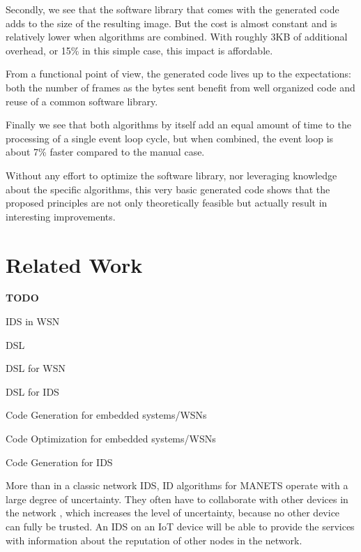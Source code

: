 \documentclass[conference]{IEEEtran}
\newcommand{\TODO}{\textbf{\color{red}TODO}}
\begin{document}
Secondly, we see that the software library that comes with the generated code
adds to the size of the resulting image. But the cost is almost constant and is
relatively lower when algorithms are combined. With roughly 3KB of additional
overhead, or 15\% in this simple case, this impact is affordable.

From a functional point of view, the generated code lives up to the
expectations: both the number of frames as the bytes sent benefit from well
organized code and reuse of a common software library.

Finally we see that both algorithms by itself add an equal amount of time to
the processing of a single event loop cycle, but when combined, the event loop
is about 7\% faster compared to the manual case.

Without any effort to optimize the software library, nor leveraging knowledge
about the specific algorithms, this very basic generated code shows that the
proposed principles are not only theoretically feasible but actually result in
interesting improvements.

\section{Related Work}
\label{related}

\TODO

IDS in WSN \cite{perrig2004security,mishra2004intrusion}

DSL \cite{fowler2010domain,mernik2005and}

DSL for WSN \cite{naumowicz2009prototyping,levis2004tinyscript}

DSL for IDS \cite{sekar1999high} \cite{uppuluri2001experiences} \cite{eckmann2002statl} \cite{vigna2003designing}

Code Generation for embedded systems/WSNs \cite{leupers2000code,marwedel2002code}

Code Optimization for embedded systems/WSNs \cite{panda2001data,naik2001software}

Code Generation for IDS \cite{charitakis2003code}


More than in a classic network IDS, ID algorithms for MANETS operate with a
large degree of uncertainty. They often have to collaborate with other devices
in the network \cite{marchang2008collaborative,krontiris2009cooperative}, which
increases the level of uncertainty, because no other device can fully be
trusted. An IDS on an IoT device will be able to provide the services with
information about the reputation \cite{ganeriwal2008reputation} of other nodes
in the network.
\end{document}
